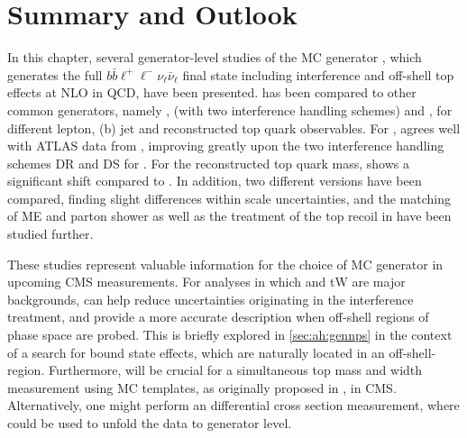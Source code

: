 \section{Summary and Outlook}

In this chapter, several generator-level studies of the MC generator \bbfourl, which generates the full $b \bar{b} \ell^+ \ell^- \nu_{\ell} \bar{\nu}_{\ell}$ final state including \tttW interference and off-shell top effects at NLO in QCD, have been presented. \bbfourl has been compared to other common \ttbar generators, namely \hvq, \ST (with two interference handling schemes) and \ttb, for different lepton, (b) jet and reconstructed top quark observables. For \mblminimax, \bbfourl agrees well with ATLAS data from , improving greatly upon the two interference handling schemes DR and DS for \tttWsum. For the reconstructed top quark mass, \bbfourl shows a significant shift compared to \tttWsum. In addition, two different \bbfourl versions have been compared, finding slight differences within scale uncertainties, and the matching of ME and parton shower as well as the treatment of the top recoil in \bbfourl have been studied further.

These studies represent valuable information for the choice of \ttbar MC generator in upcoming CMS measurements. For analyses in which \ttbar and tW are major backgrounds, \bbfourl can help reduce uncertainties originating in the \tttW interference treatment, and provide a more accurate description when off-shell regions of phase space are probed. This is briefly explored in \cref{sec:ah:gennps} in the context of a search for \ttbar bound state effects, which are naturally located in an off-shell-region. 
Furthermore, \bbfourl will be crucial for a simultaneous top mass and width measurement using MC templates, as originally proposed in , in CMS. Alternatively, one might perform an differential \tttWsum cross section measurement, where \bbfourl could be used to unfold the data to generator level. 
